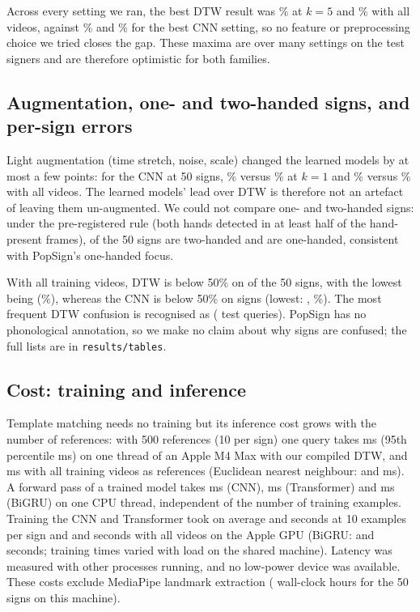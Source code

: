 Across every setting we ran, the best DTW result was \ablBestDtwKFive\% at $k=5$ and \ablBestDtwKAll\% with all videos, against
\ablBestCnnKFive\% and \ablBestCnnKAll\% for the best CNN setting, so no feature or preprocessing choice we tried closes the gap. These
maxima are over many settings on the test signers and are therefore optimistic for both families.

\subsection{Augmentation, one- and two-handed signs, and per-sign errors}
Light augmentation (time stretch, noise, scale) changed the learned models by at most a few points: for the CNN at 50 signs,
\accCnnAugVFiftyKOne\% versus \accCnnVFiftyKOne\% at $k=1$ and \accCnnAugVFiftyKAll\% versus \accCnnVFiftyKAll\% with all videos. The
learned models' lead over DTW is therefore not an artefact of leaving them un-augmented. We could not compare one- and two-handed
signs: under the pre-registered rule (both hands detected in at least half of the hand-present frames), \nTwoHandedSigns{} of the
50 signs are two-handed and \nOneHandedSigns{} are one-handed, consistent with PopSign's one-handed focus.

With all training videos, DTW is below 50\% on \nSignsDtwBelowHalf{} of the 50 signs, with the lowest being \worstSignDtw{}
(\worstSignDtwAcc\%), whereas the CNN is below 50\% on \nSignsCnnBelowHalf{} signs (lowest: \cnnWorstSign, \cnnWorstSignAcc\%). The most
frequent DTW confusion is \topConfTrue{} recognised as \topConfPred{} (\topConfN{} test queries). PopSign has no phonological
annotation, so we make no claim about why signs are confused; the full lists are in \texttt{results/tables}.

\subsection{Cost: training and inference}
Template matching needs no training but its inference cost grows with the number of references: with 500 references (10 per sign)
one query takes \latDtwKTen{} ms (95th percentile \latPDtwKTen{} ms) on one thread of an Apple M4 Max with our compiled DTW, and
\latDtwKAll{} ms with all \latRefsAll{} training videos as references (Euclidean nearest neighbour: \latEuclidKTen{} and \latEuclidKAll{} ms). A forward
pass of a trained model takes \latCnn{} ms (CNN), \latTrans{} ms (Transformer) and \latGru{} ms (BiGRU) on one CPU thread, independent
of the number of training examples. Training the CNN and Transformer took on average \trainSecCnnKTen{} and \trainSecTransKTen{}
seconds at 10 examples per sign and \trainSecCnnKAll{} and \trainSecTransKAll{} seconds with all videos on the Apple GPU (BiGRU:
\trainSecGruKTen{} and \trainSecGruKAll{} seconds; training times varied with load on the shared machine). Latency was measured with other
processes running, and no low-power device was available. These costs exclude MediaPipe landmark extraction
(\extractHours{} wall-clock hours for the 50 signs on this machine).

